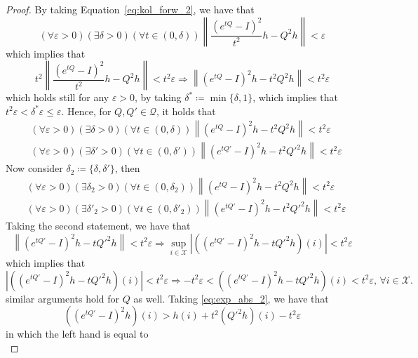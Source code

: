 \documentclass{article}
\newcommand{\statessymbol}{\mathcal{X}}
\newcommand{\matrices}{\mathcal{Q}}
\newcommand{\stateset}{\statessymbol}
\newcommand{\norm}[1]{\left\lVert #1 \right\rVert}
\newcommand{\de}{\delta}
\newcommand{\ve}{\varepsilon}
\begin{document}
\begin{proof}
\noindent
By taking Equation~\eqref{eq:kol_forw_2}, we have that
\begin{equation*}
(\forall\ve>0)(\exists \de>0)(\forall t \in(0,\de))\norm{\frac{(e^{tQ}-I)^{2}}{t^{2}}h-Q^{2}h}<\ve
\end{equation*}
which implies that
\begin{equation*}
t^{2}\norm{\frac{(e^{tQ}-I)^{2}}{t^{2}}h-Q^{2}h}<t^{2}\ve\Rightarrow \norm{(e^{tQ}-I)^{2}h-t^{2}Q^{2}h}<t^{2}\ve
\end{equation*}
which holds still for any $\ve>0$, by taking $\de^{*}\coloneqq\min\{\de,1\}$, which implies that $t^{2}\ve<\de^{*}\ve\leq\ve$.
Hence, for $Q,Q'\in \matrices$, it holds that
\begin{equation*}
\begin{split}
&(\forall\ve>0)(\exists \de>0)(\forall t \in(0,\de)) \norm{(e^{tQ}-I)^{2}h-t^{2}Q^{2}h}<t^{2}\ve\\
&(\forall\ve>0)(\exists \de'>0)(\forall t \in(0,\de')) \norm{(e^{tQ'}-I)^{2}h-t^{2}Q'^{2}h}<t^{2}\ve
\end{split}
\end{equation*}
Now consider $\de_{2}\coloneqq\{\de,\de'\}$, then
\begin{equation*}
\begin{split}
&(\forall\ve>0)(\exists \de_{2}>0)(\forall t \in(0,\de_{2})) \norm{(e^{tQ}-I)^{2}h-t^{2}Q^{2}h}<t^{2}\ve\\
&(\forall\ve>0)(\exists \de'_{2}>0)(\forall t \in(0,\de'_{2})) \norm{(e^{tQ'}-I)^{2}h-t^{2}Q'^{2}h}<t^{2}\ve
\end{split}
\end{equation*}
Taking the second statement, we have that
\begin{equation*}
\norm{(e^{tQ'}-I)^{2}h-tQ'^{2}h}<t^{2}\ve \Rightarrow \sup_{i\in\stateset}|((e^{tQ'}-I)^{2}h-tQ'^{2}h)(i)|<t^{2}\ve
\end{equation*}
which implies that
\begin{equation} \label{eq:exp_abs_2}
|((e^{tQ'}-I)^{2}h-tQ'^{2}h)(i)|<t^{2}\ve \Rightarrow -t^{2}\ve<((e^{tQ'}-I)^{2}h-tQ'^{2}h)(i)<t^{2}\ve \text{, } \forall i\in\stateset.
\end{equation}
similar arguments hold for $Q$ as well.
Taking \eqref{eq:exp_abs_2}, we have that
\begin{equation} \label{eq:exp_geq_2}
((e^{tQ'}-I)^{2}h)(i) > h(i)+t^{2}(Q'^{2}h)(i)-t^{2}\ve 
\end{equation}
in which the left hand is equal to 
\begin{equation*}

\end{equation*}
\end{proof}
\end{document}
